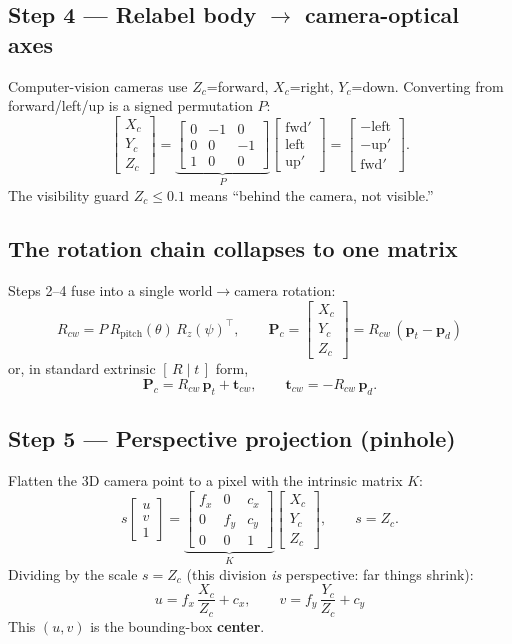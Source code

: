 \documentclass[11pt]{article}
\newcommand{\Rcw}{R_{cw}}
\newcommand{\tcw}{\bm{t}_{cw}}
\newcommand{\pd}{\bm{p}_d}
\newcommand{\pt}{\bm{p}_t}
\newcommand{\Pc}{\bm{P}_c}
\begin{document}
\subsection*{Step 4 — Relabel body $\to$ camera-optical axes}
Computer-vision cameras use $Z_c$=forward, $X_c$=right, $Y_c$=down. Converting
from forward/left/up is a signed permutation $P$:
\[
\begin{bmatrix} X_c \\ Y_c \\ Z_c \end{bmatrix}
=
\underbrace{\begin{bmatrix}
0 & -1 & 0 \\
0 & 0 & -1 \\
1 & 0 & 0
\end{bmatrix}}_{P}
\begin{bmatrix} \text{fwd}' \\ \text{left} \\ \text{up}' \end{bmatrix}
=
\begin{bmatrix} -\text{left} \\ -\text{up}' \\ \text{fwd}' \end{bmatrix}.
\]
The visibility guard $Z_c \le 0.1$ means ``behind the camera, not visible.''

\subsection*{The rotation chain collapses to one matrix}
Steps 2--4 fuse into a single world$\to$camera rotation:
\[
\boxed{\;\Rcw = P\,R_{\text{pitch}}(\theta)\,R_z(\psi)^\top,\qquad
\Pc = \begin{bmatrix} X_c \\ Y_c \\ Z_c \end{bmatrix} = \Rcw\,(\pt - \pd)\;}
\]
or, in standard extrinsic $[\,R \mid t\,]$ form,
\[
\Pc = \Rcw\,\pt + \tcw,\qquad \tcw = -\Rcw\,\pd .
\]

\subsection*{Step 5 — Perspective projection (pinhole)}
Flatten the 3D camera point to a pixel with the intrinsic matrix $K$:
\[
s \begin{bmatrix} u \\ v \\ 1 \end{bmatrix}
=
\underbrace{\begin{bmatrix}
f_x & 0 & c_x \\
0 & f_y & c_y \\
0 & 0 & 1
\end{bmatrix}}_{K}
\begin{bmatrix} X_c \\ Y_c \\ Z_c \end{bmatrix},
\qquad s = Z_c .
\]
Dividing by the scale $s=Z_c$ (this division \emph{is} perspective: far things
shrink):
\[
\boxed{\;u = f_x\,\frac{X_c}{Z_c} + c_x,\qquad
v = f_y\,\frac{Y_c}{Z_c} + c_y\;}
\]
This $(u,v)$ is the bounding-box \textbf{center}.
\end{document}

